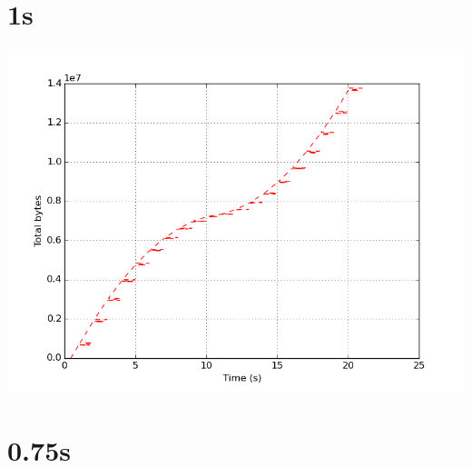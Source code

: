 \documentclass{article}
\begin{document}
\section{1s}
    \noindent\begin{minipage}{.45\textwidth}
    
    \end{minipage}\hfill
    \begin{minipage}{.45\textwidth}
    
    \end{minipage}
    
    \begin{center}
    \includegraphics{set_a_1s/set_a_1s.png}
    \end{center}
\clearpage

\section{0.75s}
    \noindent\begin{minipage}{.45\textwidth}
    
    \end{minipage}\hfill
    \begin{minipage}{.45\textwidth}
    
    \end{minipage}
    
\end{document}
